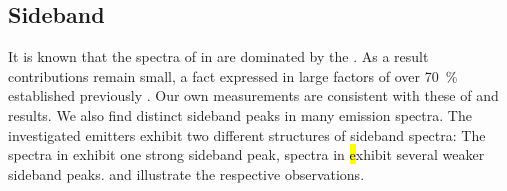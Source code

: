 
	\subsection{Sideband} \label{subsubsec::sideband}

		It is known that the \pl spectra of \sivs in \nd are dominated by the \zpl. As a result \psb contributions remain small, a fact expressed in large \db factors of over \SI{70}{\percent} established previously \cite{Neu2011,Neu2011b}. Our own measurements are consistent with these of \emnarrow and \embroad results. We also find distinct sideband peaks in many \siv \pl emission spectra.
		The investigated emitters exhibit two different structures of sideband spectra: The spectra in \vl exhibit one strong sideband peak, spectra in \hl exhibit several weaker sideband peaks.  and  illustrate the respective observations.

